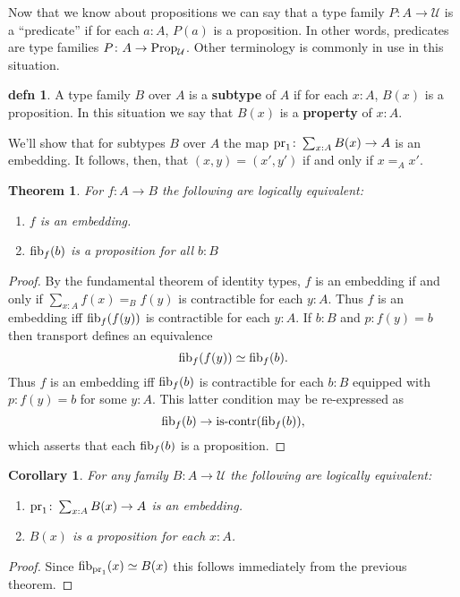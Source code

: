\documentclass{amsart}
\theoremstyle{theorem}
\newtheorem*{thm}{Theorem}
\newtheorem*{cor}{Corollary}
\theoremstyle{definition}
\newtheorem*{defn}{defn}
\theoremstyle{remark}
\newcommand{\0}{\mathbbe{0}}
\newcommand{\1}{\mathbbe{1}}
\newcommand{\2}{\mathbbe{2}}
\newcommand{\3}{\mathbbe{3}}
\newcommand{\4}{\mathbbe{4}}
\newcommand{\term}[1]{{\textup{#1}}}
\newcommand{\type}[1]{{\textup{#1}}}
\newcommand{\pr}{\term{pr}}
\newcommand{\UU}{{\mathcal{U}}}
\newcommand{\iscontr}{\type{is-contr}}
\newcommand{\fib}{\type{fib}}
\newcommand{\Prop}{\type{Prop}_{\UU}}
\begin{document}
Now that we know about propositions we can say that a type family $P \colon A \to \UU$ is a ``predicate'' if for each $a :A$, $P(a)$ is a proposition. In other words, predicates are type families $P \colon A \to \Prop$. Other terminology is commonly in use in this situation.

\begin{defn} A type family $B$ over $A$ is a \textbf{subtype} of $A$ if for each $x:A$, $B(x)$ is a proposition. In this situation we say that $B(x)$ is a \textbf{property} of $x:A$.
\end{defn}

We'll show that for subtypes $B$ over $A$ the map $\pr_1 \colon \sum_{x:A} B(x) \to A$ is an embedding. It follows, then, that $(x,y) = (x',y')$ if and only if $x=_Ax'$.

\begin{thm} For $f : A \to B$ the following are logically equivalent:
\begin{enumerate}
\item $f$ is an embedding.
\item $\fib_f(b)$ is a proposition for all $b : B$
\end{enumerate}
\end{thm}
\begin{proof}
By the fundamental theorem of identity types, $f$ is an embedding if and only if $\sum_{x:A}f(x)=_B f(y)$ is contractible for each $y :A$. Thus $f$ is an embedding iff $\fib_f(f(y))$ is contractible for each $y : A$. If $b:B$ and $p : f(y) = b$ then transport defines an equivalence
\[ \fib_f(f(y)) \simeq \fib_f(b).\]
Thus $f$ is an embedding iff $\fib_f(b)$ is contractible for each $b : B$ equipped with $p : f(y) = b$ for some $y:A$. This latter condition may be re-expressed as \[ \fib_f(b) \to \iscontr(\fib_f(b)),\]
which asserts that each $\fib_f(b)$ is a proposition.
\end{proof}

\begin{cor} For any family $B : A \to \UU$ the following are logically equivalent:
\begin{enumerate}
\item $\pr_1 \colon \sum_{x:A} B(x) \to A$ is an embedding.
\item $B(x)$ is a proposition for each $x:A$.
\end{enumerate}
\end{cor}
\begin{proof}
Since $\fib_{\pr_1}(x) \simeq B(x)$ this follows immediately from the previous theorem.
\end{proof}
\end{document}
